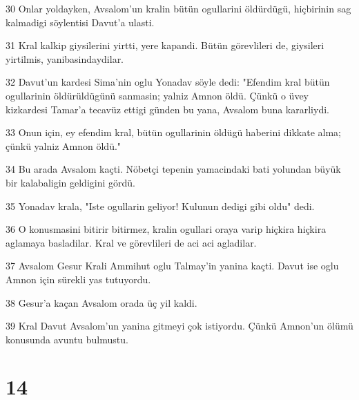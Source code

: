 \par 30 Onlar yoldayken, Avsalom'un kralin bütün ogullarini öldürdügü, hiçbirinin sag kalmadigi söylentisi Davut'a ulasti.
\par 31 Kral kalkip giysilerini yirtti, yere kapandi. Bütün görevlileri de, giysileri yirtilmis, yanibasindaydilar.
\par 32 Davut'un kardesi Sima'nin oglu Yonadav söyle dedi: "Efendim kral bütün ogullarinin öldürüldügünü sanmasin; yalniz Amnon öldü. Çünkü o üvey kizkardesi Tamar'a tecavüz ettigi günden bu yana, Avsalom buna kararliydi.
\par 33 Onun için, ey efendim kral, bütün ogullarinin öldügü haberini dikkate alma; çünkü yalniz Amnon öldü."
\par 34 Bu arada Avsalom kaçti. Nöbetçi tepenin yamacindaki bati yolundan büyük bir kalabaligin geldigini gördü.
\par 35 Yonadav krala, "Iste ogullarin geliyor! Kulunun dedigi gibi oldu" dedi.
\par 36 O konusmasini bitirir bitirmez, kralin ogullari oraya varip hiçkira hiçkira aglamaya basladilar. Kral ve görevlileri de aci aci agladilar.
\par 37 Avsalom Gesur Krali Ammihut oglu Talmay'in yanina kaçti. Davut ise oglu Amnon için sürekli yas tutuyordu.
\par 38 Gesur'a kaçan Avsalom orada üç yil kaldi.
\par 39 Kral Davut Avsalom'un yanina gitmeyi çok istiyordu. Çünkü Amnon'un ölümü konusunda avuntu bulmustu.

\chapter{14}

